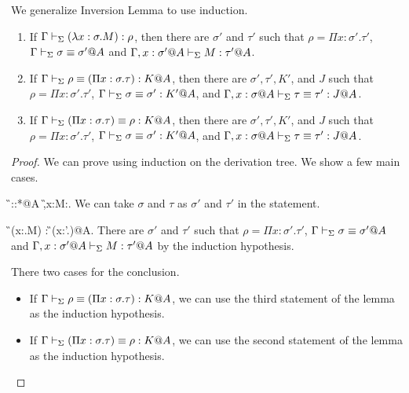 We generalize Inversion Lemma to use induction.
\begin{lemma}
    \label{lemma:InversionLemmaForPiType}
    \begin{enumerate}
        \item If $\Gamma \vdash_\Sigma (\lambda x:\sigma.M) : \rho$, then there are $\sigma'$ and $\tau'$ such that
            $\rho = \Pi x:\sigma'.\tau'$, $\Gamma \vdash_\Sigma \sigma \equiv \sigma'@A$ and $\Gamma ,x:\sigma'@A\vdash_\Sigma M:\tau'@A$.
        \item If $\Gamma \vdash_\Sigma \rho \equiv (\Pi x:\sigma.\tau) : K @A$, then there are $\sigma', \tau', K'$, and $J$ such that
            $\rho = \Pi x:\sigma'.\tau'$, $\Gamma \vdash_\Sigma \sigma \equiv \sigma' : K' @A$, and $\G, x:\sigma@A\V \tau \E \tau' : J @A$.
        \item If $\Gamma \vdash_\Sigma (\Pi x:\sigma.\tau) \equiv \rho : K @A$, then there are $\sigma', \tau', K'$, and $J$ such that
            $\rho = \Pi x:\sigma'.\tau'$, $\Gamma \vdash_\Sigma \sigma \equiv \sigma' : K' @A$, and $\G, x:\sigma@A\V \tau \E \tau' : J @A$.
    \end{enumerate}
\end{lemma}

\begin{proof}
    We can prove using induction on the derivation tree.
    We show a few main cases.

    \begin{rneqncase}{\TAbs{}}{
            \G\V \sigma::*@A  \G,x:\sigma@A\V M:\tau@A.
            }
            We can take $\sigma$ and $\tau$ as $\sigma'$ and $\tau'$ in the statement.
    \end{rneqncase}

    \begin{rneqncase}{\TConv{}}{
            \G \V (\lambda x:\sigma.M) : \rho@A {} \G \V \rho \E (\Pi x:\sigma'.\tau)@A.
            }
            There are $\sigma'$ and $\tau'$ such that
            $\rho = \Pi x:\sigma'.\tau'$, $\Gamma \vdash_\Sigma \sigma \equiv \sigma'@A$ and $\Gamma ,x:\sigma'@A\vdash_\Sigma M:\tau'@A$
            by the induction hypothesis.
    \end{rneqncase}

    \begin{rneqncase}{\QTRefl{}}{}
        There two cases for the conclusion.
        \begin{itemize}
            \item If $\Gamma \vdash_\Sigma \rho \equiv (\Pi x:\sigma.\tau) : K @A$,
                we can use the third statement of the lemma as the induction hypothesis.
            \item If $\Gamma \vdash_\Sigma (\Pi x:\sigma.\tau) \equiv \rho : K @A$,
                we can use the second statement of the lemma as the induction hypothesis.
        \end{itemize}
    \end{rneqncase}

\end{proof}


